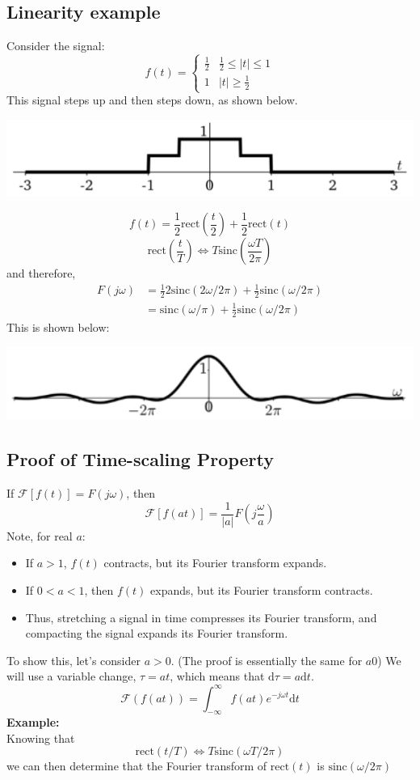 \documentclass[10pt]{article}
\newcommand{\example}{\textbf{Example: }}
\newcommand{\sinc}{\text{sinc}}
\begin{document}
\subsection*{Linearity example}
Consider the signal:
\[f(t) = \begin{cases}\frac{1}{2} & \frac{1}{2} \leq |t| \leq 1 \\ 1 & |t| \geq \frac{1}{2}\end{cases}\]
This signal steps up and then steps down, as shown below.
\begin{center}
    \includegraphics[scale=0.7]{W5_4.png}
\end{center}
\[f(t) = \frac{1}{2} \text{rect}\left(\frac{t}{2}\right) + \frac{1}{2} \text{rect}(t)\]
\[\text{rect}\left(\frac{t}{T}\right)\Longleftrightarrow T \sinc \left(\frac{\omega T}{2\pi}\right)\]
and therefore,
\begin{align*}
    F(j\omega) &= \frac{1}{2}2\sinc(2\omega/2\pi) + \frac{1}{2} \sinc(\omega/2\pi)\\
    &= \sinc(\omega/\pi) + \frac{1}{2} \sinc(\omega/2\pi)
\end{align*}
This is shown below:
\begin{center}
    \includegraphics[scale=0.7]{W5_5.png}
\end{center}

\subsection*{Proof of Time-scaling Property}
If $\mathcal{F}[f(t)] = F(j\omega)$, then
\[\boxed{\mathcal{F}[f(at)] = \frac{1}{|a|}F\left(j \frac{\omega}{a}\right)}\] 
Note, for real $a$:
\begin{itemize}
    \item If $a > 1$, $f(t)$ contracts, but its Fourier transform expands.
    \item If $0 < a < 1$, then $f(t)$ expands, but its Fourier transform contracts.
    \item Thus, stretching a signal in time compresses its Fourier transform, and compacting the signal expands its Fourier transform.
\end{itemize}
To show this, let's consider $a > 0$.  (The proof is essentially the same for $a  0$)  We will use a variable change, $\tau = at$, which means that $\text{d}\tau = a\text{d}t$.
\[\mathcal{F}(f(at)) = \int_{-\infty}^\infty f(at) e^{-j\omega t} \text{d}t\]
\example\\
Knowing that
\[\text{rect}(t/T) \Longleftrightarrow T\sinc(\omega T/2\pi)\]
we can then determine that the Fourier transform of $\text{rect}(t)$ is $\sinc(\omega/2\pi)$
\end{document}
